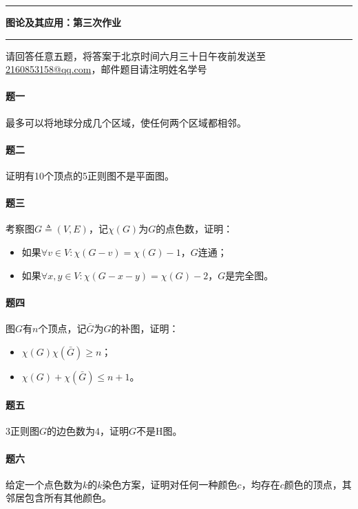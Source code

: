 \documentclass[UTF8]{ctexart}
\begin{document}
\begin{center}
	\hrule
	\vspace{.4cm}
	{\textbf { \Large 图论及其应用：第三次作业}}
\end{center}
	\hrule
	
\vspace{0.5cm}
	
\noindent 请回答任意五题，将答案于北京时间六月三十日午夜前发送至\url{2160853158@qq.com}，邮件题目请注明姓名学号 

\vspace{0.5cm}

\paragraph*{题一}
最多可以将地球分成几个区域，使任何两个区域都相邻。

\paragraph*{题二}
证明有10个顶点的5正则图不是平面图。

\paragraph*{题三} 	
考察图$G\triangleq(V,E)$，记$\chi(G)$为$G$的点色数，证明：
\begin{itemize}
    \item 如果$\forall v\in V:\chi(G-v)=\chi(G)-1$，$G$连通；
    \item 如果$\forall x,y\in V:\chi(G-x-y)=\chi(G)-2$，$G$是完全图。
\end{itemize}


\paragraph*{题四} 	
图$G$有$n$个顶点，记$\bar{G}$为$G$的补图，证明：
\begin{itemize}
    \item $\chi(G)\chi(\bar{G})\ge n$；
    \item $\chi(G)+\chi(\bar{G})\le n+1$。
\end{itemize}

\paragraph*{题五} 
3正则图$G$的边色数为$4$，证明$G$不是H图。


\paragraph*{题六} 
给定一个点色数为$k$的$k$染色方案，证明对任何一种颜色$c$，均存在$c$颜色的顶点，其邻居包含所有其他颜色。
\end{document}
